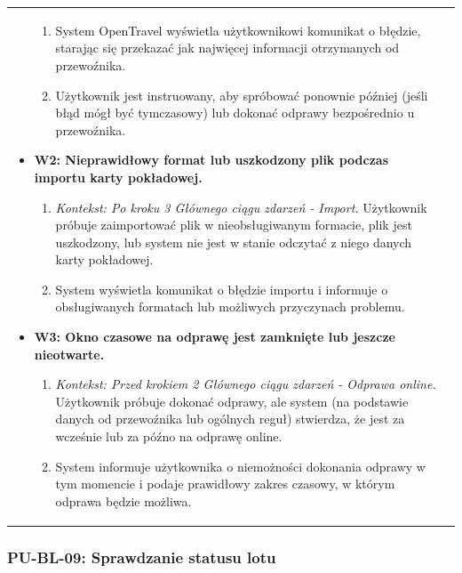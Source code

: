 \documentclass[a4paper,12pt]{article}
\begin{document}
\begin{longtable}{|p{\pierwszakolumnaszerokoscPUBLKartaPok}|p{\drugakolumnaszerokoscPUBLKartaPok}|}
\begin{itemize}
\begin{enumerate}
                    \item System OpenTravel wyświetla użytkownikowi komunikat o błędzie, starając się przekazać jak najwięcej informacji otrzymanych od przewoźnika.
                    \item Użytkownik jest instruowany, aby spróbować ponownie później (jeśli błąd mógł być tymczasowy) lub dokonać odprawy bezpośrednio u przewoźnika.
                \end{enumerate}
            \item \textbf{W2: Nieprawidłowy format lub uszkodzony plik podczas importu karty pokładowej.}
                \begin{enumerate} \itemsep0pt \parskip0pt \parsep0pt
                    \item \textit{Kontekst: Po kroku 3 Głównego ciągu zdarzeń - Import.} Użytkownik próbuje zaimportować plik w nieobsługiwanym formacie, plik jest uszkodzony, lub system nie jest w stanie odczytać z niego danych karty pokładowej.
                    \item System wyświetla komunikat o błędzie importu i informuje o obsługiwanych formatach lub możliwych przyczynach problemu.
                \end{enumerate}
            \item \textbf{W3: Okno czasowe na odprawę jest zamknięte lub jeszcze nieotwarte.}
                \begin{enumerate} \itemsep0pt \parskip0pt \parsep0pt
                    \item \textit{Kontekst: Przed krokiem 2 Głównego ciągu zdarzeń - Odprawa online.} Użytkownik próbuje dokonać odprawy, ale system (na podstawie danych od przewoźnika lub ogólnych reguł) stwierdza, że jest za wcześnie lub za późno na odprawę online.
                    \item System informuje użytkownika o niemożności dokonania odprawy w tym momencie i podaje prawidłowy zakres czasowy, w którym odprawa będzie możliwa.
                \end{enumerate}
        \end{itemize} \\
\end{longtable}
\endgroup

\subsubsection{PU-BL-09: Sprawdzanie statusu lotu}

\begingroup %
\small %
\renewcommand{\arraystretch}{1.2} %
\end{document}
